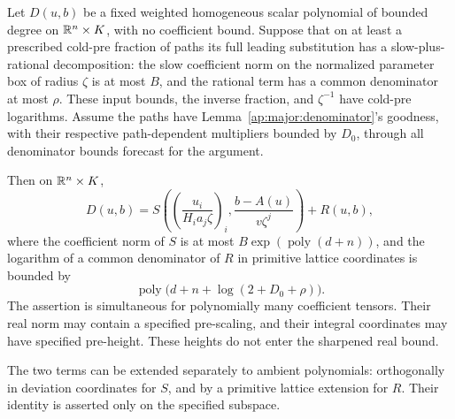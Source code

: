 \begin{lemma}\label{ap:major:refinement}
Let $D(u,b)$ be a fixed weighted homogeneous scalar polynomial of
bounded degree on $\mathbb R^n\times K$, with no coefficient bound.  Suppose
that on at least a prescribed cold-pre fraction of paths its full
leading substitution has a slow-plus-rational decomposition: the
slow coefficient norm on the normalized parameter box of radius
$\zeta$ is at most $B$, and the rational term has a common
denominator at most $\rho$.  These input bounds, the inverse fraction,
and $\zeta^{-1}$ have cold-pre logarithms.  Assume the paths have
Lemma~\ref{ap:major:denominator}'s goodness, with their respective
path-dependent multipliers bounded by $D_0$,
through all denominator bounds forecast for the argument.

Then on $\mathbb R^n\times K$,
\begin{equation}\label{ap:major:sharp-form}
 D(u,b)=
 S\left(\left(\frac{u_i}{H_i a_j\zeta}\right)_i,
               \frac{b-A(u)}{v\zeta^j}\right)+R(u,b),
\end{equation}
where the coefficient norm of $S$ is at most
$B\exp(\operatorname{poly}(d+n))$, and the logarithm of a common
denominator of $R$ in primitive lattice coordinates is bounded by
\[
       \operatorname{poly}\bigl(d+n+\log(2+D_0+\rho)\bigr).
\]
The assertion is simultaneous for polynomially many coefficient
tensors.  Their real norm may contain a specified pre-scaling, and
their integral coordinates may have specified pre-height.  These
heights do not enter the sharpened real bound.

The two terms can be extended separately to ambient polynomials:
orthogonally in deviation coordinates for $S$, and by a primitive
lattice extension for $R$.  Their identity is asserted only on the
specified subspace.
\end{lemma}

